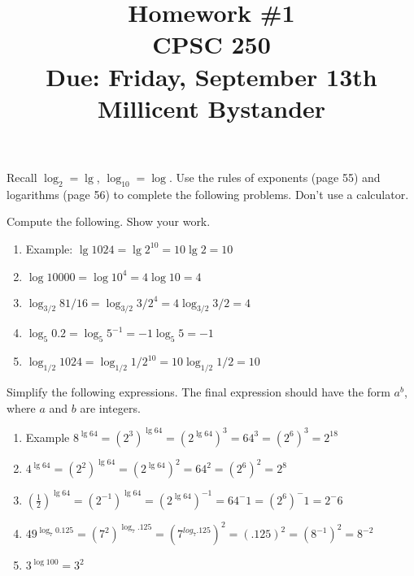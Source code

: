 \documentclass[12pt]{article}
\newenvironment{problem}[2][Problem]{\begin{trivlist}
\item[\hskip \labelsep {\bfseries #1}\hskip \labelsep {\bfseries #2.}]}{\end{trivlist}}
\begin{document}

\title{Homework \#1 \\ CPSC 250 \\ Due: Friday, September 13th \\ Millicent Bystander}%
\date{}

\maketitle

\noindent
Recall $\log_2 = \lg$, $\log_{10} = \log$. Use the rules of exponents (page 55) and logarithms (page 56) to complete the following problems. Don't use a calculator.

\begin{problem}{1}
 Compute the following. Show your work.
\begin{enumerate}
 \item Example: $\lg 1024 = \lg 2^{10} = 10 \lg 2 = 10$
 
 \item $\log 10000 = \log 10^{4} = 4 \log 10 = 4$
 
 \item $\log_{3/2} 81/16 = \log_{3/2} 3/2^{4} = 4 \log_{3/2} 3/2 = 4$
 
 \item $\log_5 0.2 = \log_5 5^{-1} = -1 \log_5 5 = -1$
 
 \item $\log_{1/2} 1024 = \log_{1/2} 1/2^{10} = 10 \log_{1/2} 1/2 = 10$
 
\end{enumerate}
\end{problem}

\begin{problem}{2} 
Simplify the following expressions. The final expression should have the form $a^b$,
where $a$ and $b$ are integers.
\begin{enumerate}
 \item Example $ 8^{\lg 64} = (2^3)^{\lg 64} = (2^{\lg 64})^3 = 64^3 = (2^6)^3 = 2^{18}$
 
 \item $ 4^{\lg 64}= (2^{2})^{\lg 64} = (2^{\lg 64})^{2} = 64^2 = (2^6)^2 = 2^8 $
 
 \item $ (\frac{1}{2})^{\lg 64}= (2^{-1})^{\lg 64} = (2^{\lg 64})^{-1} = 64^-1 = (2^6)^-1 = 2^-6 $
 
 \item $ 49^{\log_7 0.125}= (7^{2})^{\log_7 .125} = (7^{log_7 .125})^2 = (.125)^2 = (8^{-1})^2 = 8^{-2}$
 
 \item $ 3^{\log 100}= 3^2 $
 
\end{enumerate}
\end{problem}
\end{document}
